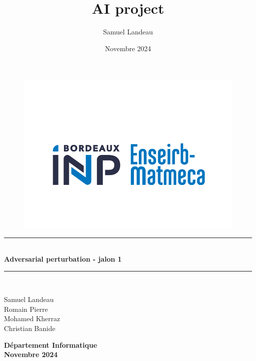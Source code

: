 \documentclass{article}
\title{AI project}
\author{Samuel Landeau}
\date{Novembre 2024}
\begin{document}
\begin{titlepage}


  \begin{center}



    \begin{figure}
      \centering
      \includegraphics[width=12cm]{results/logo_enseirb.png}
    \end{figure}

    \rule{0.7\linewidth}{1pt} \\[0.4cm]
    { \huge \bfseries Adversarial perturbation - jalon 1 \\[0.4cm]}
    \rule{0.7\linewidth}{1pt}\\ [0.4cm]

    \vspace*{1cm}

        \Large Samuel Landeau\\
        \Large Romain Pierre\\
        \Large Mohamed Kherraz\\
        \Large Christian Banide\\
        

    \vspace*{2cm}

    \hfill

    \Large \textbf{Département Informatique}\\
    \Large \textbf{Novembre 2024}\\

  \end{center}

  \restoregeometry

\end{titlepage}
\end{document}
